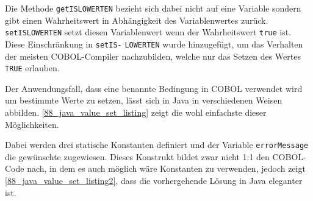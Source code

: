 
Die Methode \texttt{getISLOWERTEN} bezieht sich dabei nicht auf eine Variable sondern gibt einen Wahrheitswert in Abhängigkeit des Variablenwertes zurück. \texttt{setISLOWERTEN} setzt diesen Variablenwert wenn der Wahrheitswert \texttt{true} ist. Diese Einschränkung in \texttt{setIS-} \texttt{LOWERTEN} wurde hinzugefügt, um das Verhalten der meisten COBOL-Compiler nachzubilden, welche nur das Setzen des Wertes \texttt{TRUE} erlauben.


Der Anwendungsfall, dass eine benannte Bedingung in COBOL verwendet wird um bestimmte Werte zu setzen, lässt sich in Java in verschiedenen Weisen abbilden. \autoref{88_java_value_set_listing} zeigt die wohl einfachste dieser Möglichkeiten.


Dabei werden drei statische Konstanten definiert und der Variable \texttt{errorMessage} die gewünschte zugewiesen. Dieses Konstrukt bildet zwar nicht 1:1 den COBOL-Code nach, in dem es auch möglich wäre Konstanten zu verwenden, jedoch zeigt \autoref{88_java_value_set_listing2}, dass die vorhergehende Lösung in Java eleganter ist.